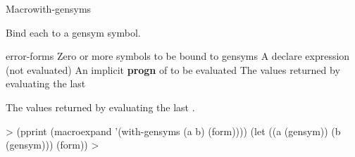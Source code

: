 \documentclass[10pt,twoside,english,pdftex]{article}
\begin{document}
\begin{functiondoc}{Macro}{with-gensyms}{%
    }
\fnsyntax

\fnpurpose Bind each  to a gensym symbol.

\fnpackage {}

\fnmodule {}

\fnargs
\begin{args}{error-forms}
\arg[symbols] Zero or more symbols to be bound to gensyms
\arg[declaration] A declare expression (not evaluated)
\arg[forms] An implicit \textbf{progn} of  to be evaluated
\arg[results] The values returned by evaluating the last 
\end{args}

\fnreturns The values returned by evaluating the last .

\fnexamples
%
\W\supp
\begin{example}
  > (pprint (macroexpand '(with-gensyms (a b) (form))))
  (let ((a (gensym))
        (b (gensym)))
    (form))
  >
\end{example}

\end{functiondoc}

\end{document}

